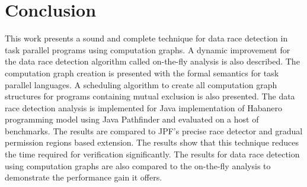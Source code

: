 \section{Conclusion} \label{sec:conclusion}
This work presents a sound and complete technique for data race detection in task parallel programs using computation graphs. A dynamic improvement for the data race detection algorithm called on-the-fly analysis is also described. The computation graph creation is presented with the formal semantics for task parallel languages. A scheduling algorithm to create all computation graph structures for programs containing mutual exclusion is also presented. The data race detection analysis is implemented for Java implementation of Habanero programming model using Java Pathfinder and evaluated on a host of benchmarks. The results are compared to JPF's precise race detector and gradual permission regions based extension. The results show that this technique reduces the time required for verification significantly. The results for data race detection using computation graphs are also compared to the on-the-fly analysis to demonstrate the performance gain it offers.

\begin{comment}
This work can be extended in the following ways:
\begin{itemize}
\item The data race detector based on computation graphs explores just one control flow path that is taken by the program execution based on the input. The listener can be extended to explore other control flow paths by using Symbolic Execution.
\item The computation graphs can be created statically using program instrumentation and analyzed to gain performance improvements.
\end{itemize}
\end{comment}